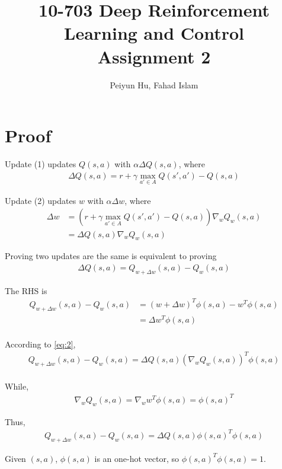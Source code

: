 \documentclass{article}
\title{10-703 Deep Reinforcement Learning and Control \\ Assignment 2 \\}
\date{}
\author{Peiyun Hu, Fahad Islam}
\begin{document}
\maketitle

\section{Proof}
Update (1) updates $Q(s,a)$ with $\alpha \Delta Q(s,a)$, where
\begin{align}
  \label{eq:1}
  \Delta Q(s,a) = r + \gamma \max_{a' \in A} Q(s', a') - Q(s,a)
\end{align}

Update (2) updates $w$ with $\alpha \Delta w$, where
\begin{align}
  \label{eq:2}
  \Delta w &= (r + \gamma \max_{a' \in A} Q(s', a') - Q(s,a)) \nabla_{w} Q_{w}(s,a) \\
           &= \Delta Q(s,a) \nabla_{w} Q_{w}(s,a) 
\end{align}

Proving two updates are the same is equivalent to proving
\begin{align}
  \label{eq:3}
  \Delta Q(s,a) = Q_{w+\Delta w}(s,a) - Q_{w}(s,a) 
\end{align}

The RHS is 
\begin{align}
  \label{eq:4}
  Q_{w+\Delta w}(s,a) - Q_{w}(s,a) &= (w + \Delta w)^{T} \phi(s,a) - w^{T} \phi(s,a) \\
                                   &= \Delta w^{T} \phi(s,a) \\
\end{align}

According to \eqref{eq:2},
\begin{align}
  \label{eq:5}
  Q_{w+\Delta w}(s,a) - Q_{w}(s,a) = \Delta Q(s,a) (\nabla_{w} Q_{w}(s,a))^{T} \phi(s,a)\\
\end{align}

While,
\begin{align}
  \label{eq:6}
  \nabla_{w} Q_{w}(s,a) = \nabla_{w} w^{T}\phi(s,a) = \phi(s,a)^{T}
\end{align}

Thus,
\begin{align}
  \label{eq:7}
  Q_{w+\Delta w}(s,a) - Q_{w}(s,a) = \Delta Q(s,a) \phi(s,a)^{T} \phi(s,a)
\end{align}

Given $(s,a)$, $\phi(s,a)$ is an one-hot vector, so $\phi(s,a)^{T} \phi(s,a) = 1$.
\end{document}
